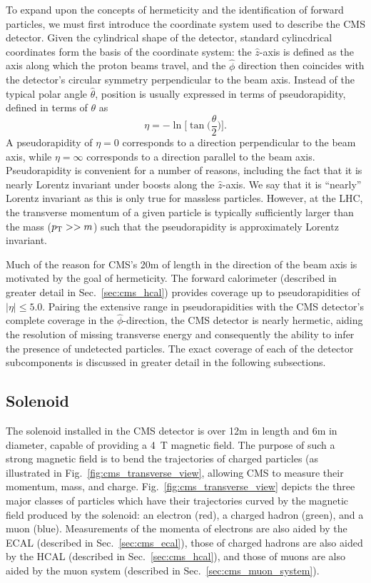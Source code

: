 To expand upon the concepts of hermeticity and the identification of forward particles, we must first introduce the coordinate system used to describe the CMS detector.
Given the cylindrical shape of the detector, standard cylincdrical coordinates form the basis of the coordinate system: the $\hat{z}$-axis is defined as the axis along which the proton beams travel, and the $\hat{\phi}$ direction then coincides with the detector's circular symmetry perpendicular to the beam axis.
Instead of the typical polar angle $\hat{\theta}$, position is usually expressed in terms of pseudorapidity, defined in terms of $\theta$ as
\begin{equation}
    \eta = -\ln \Bigg[ \tan \bigg(\frac{\theta}{2}\bigg) \Bigg].
\end{equation}
A pseudorapidity of $\eta = 0$ corresponds to a direction perpendicular to the beam axis, while $\eta = \infty$ corresponds to a direction parallel to the beam axis.
Pseudorapidity is convenient for a number of reasons, including the fact that it is nearly Lorentz invariant under boosts along the $\hat{z}$-axis.
We say that it is ``nearly'' Lorentz invariant as this is only true for massless particles.
However, at the LHC, the transverse momentum of a given particle is typically sufficiently larger than the mass ($p_{\mathrm{T}} >> m$) such that the pseudorapidity is approximately Lorentz invariant. 

Much of the reason for CMS's 20m of length in the direction of the beam axis is motivated by the goal of hermeticity.
The forward calorimeter (described in greater detail in Sec.~\ref{sec:cms_hcal}) provides coverage up to pseudorapidities of $|\eta| \leq 5.0$.
Pairing the extensive range in pseudorapidities with the CMS detector's complete coverage in the $\hat{\phi}$-direction, the CMS detector is nearly hermetic, aiding the resolution of missing transverse energy and consequently the ability to infer the presence of undetected particles.
The exact coverage of each of the detector subcomponents is discussed in greater detail in the following subsections.

\subsection{Solenoid}
The solenoid installed in the CMS detector is over 12m in length and 6m in diameter, capable of providing a 4~T magnetic field.
The purpose of such a strong magnetic field is to bend the trajectories of charged particles (as illustrated in Fig.~\ref{fig:cms_transverse_view}, allowing CMS to measure their momentum, mass, and charge.
Fig.~\ref{fig:cms_transverse_view} depicts the three major classes of particles which have their trajectories curved by the magnetic field produced by the solenoid: an electron (red), a charged hadron (green), and a muon (blue).
Measurements of the momenta of electrons are also aided by the ECAL (described in Sec.~\ref{sec:cms_ecal}), those of charged hadrons are also aided by the HCAL (described in Sec.~\ref{sec:cms_hcal}), and those of muons are also aided by the muon system (described in Sec.~\ref{sec:cms_muon_system}).

